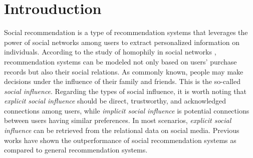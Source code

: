 \documentclass[letterpaper]{article} %
\begin{document}
\section{Introuduction}
Social recommendation is a type of recommendation systems that leverages the power of social networks among users to extract personalized information on individuals. According to the study of homophily in social networks \cite{birds_of_feather, dual_graph}, recommendation systems can be modeled not only based on users' purchase records but also their social relations. As commonly known, people may make decisions under the influence of their family and friends. This is the so-called \textit{social influence}. Regarding the types of social influence, it is worth noting that \textit{explicit social influence} should be direct, trustworthy, and acknowledged connections among users, while \textit{implicit social influence} is potential connections between users having similar preferences. In most scenarios, \textit{explicit social influence} can be retrieved from the relational data on social media. Previous works \cite{sorec, socialmf, trustsvd} have shown the outperformance of social recommendation systems as compared to general recommendation systems.
\end{document}
